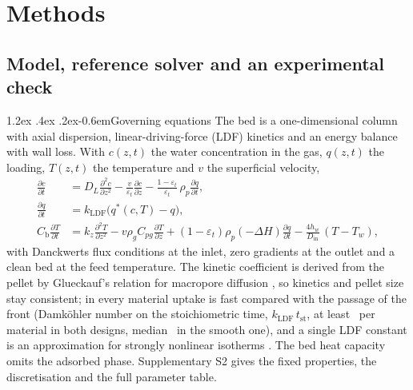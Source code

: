 \documentclass[10pt,a4paper]{article}
\makeatletter
\renewcommand\paragraph{\@startsection{paragraph}{4}{\z@}%
  {1.2ex \@plus .4ex \@minus .2ex}{-0.6em}{\normalfont\normalsize\bfseries}}
\makeatother
\begin{document}
\section{Methods}
\label{sec:methods}

\subsection{Model, reference solver and an experimental check}
\label{sec:model}

\paragraph{Governing equations} The bed is a one-dimensional column with axial
dispersion, linear-driving-force (LDF) kinetics and an energy balance with wall loss.
With \(c(z,t)\) the water concentration in the gas, \(q(z,t)\) the loading, \(T(z,t)\)
the temperature and \(v\) the superficial velocity,
\begin{align}
\frac{\partial c}{\partial t} &= D_L \frac{\partial^2 c}{\partial z^2}
 - \frac{v}{\varepsilon_t}\frac{\partial c}{\partial z}
 - \frac{1-\varepsilon_t}{\varepsilon_t}\,\rho_p \frac{\partial q}{\partial t},
\label{eq:mass}\\
\frac{\partial q}{\partial t} &= k_{\mathrm{LDF}}\bigl(q^{*}(c,T) - q\bigr),
\label{eq:ldf}\\
C_{\mathrm{b}}\frac{\partial T}{\partial t} &= k_z \frac{\partial^2 T}{\partial z^2}
 - v\rho_g C_{pg}\frac{\partial T}{\partial z}
 + (1-\varepsilon_t)\rho_p(-\Delta H)\frac{\partial q}{\partial t}
 - \frac{4h_w}{D_{\mathrm{in}}}\,(T - T_w),
\label{eq:energy}
\end{align}
with Danckwerts flux conditions at the inlet, zero gradients at the outlet and a clean
bed at the feed temperature. The kinetic coefficient is derived from the pellet by
Glueckauf's relation for macropore diffusion \cite{glueckauf1947theory,glueckauf1955theory},
so kinetics and pellet size stay consistent; in every material uptake is fast compared with
the passage of the front (Damk\"ohler number on the stoichiometric time,
\(k_{\mathrm{LDF}}\,t_{\mathrm{st}}\), at least \nDaStMin\ per material in both designs, median \nDaStMed\ in the smooth one), and a single
LDF constant is an approximation for strongly nonlinear isotherms \cite{sircar2000why}.
The bed heat capacity omits the adsorbed phase. Supplementary S2 gives the fixed
properties, the discretisation and the full parameter table.
\end{document}
